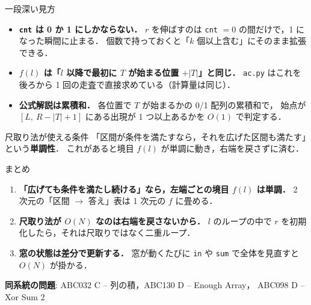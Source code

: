 \documentclass[dvipdfmx,aspectratio=169]{beamer}
\begin{document}
\begin{frame}{一段深い見方}
  \begin{itemize}
    \item \textbf{\texttt{cnt} は 0 か 1 にしかならない．}
      $r$ を伸ばすのは \texttt{cnt} $=0$ の間だけで，1 になった瞬間に止まる．
      個数で持っておくと「$k$ 個以上含む」にそのまま拡張できる．
    \item \textbf{$f(l)$ は「$l$ 以降で最初に $T$ が始まる位置 $+|T|$」と同じ．}
      \texttt{ac.py} はこれを後ろから 1 回の走査で直接求めている（計算量は同じ）．
    \item \textbf{公式解説は累積和．}
      各位置で $T$ が始まるかの 0/1 配列の累積和で，
      始点が $[L,\ R-|T|+1]$ にある出現が 1 つ以上あるかを $O(1)$ で判定する．
  \end{itemize}

  \vspace{0.4em}
  \begin{block}{尺取り法が使える条件}
    「区間が条件を満たすなら，それを広げた区間も満たす」という\textbf{単調性}．
    これがあると境目 $f(l)$ が単調に動き，右端を戻さずに済む．
  \end{block}
\end{frame}

\begin{frame}{まとめ}
  \begin{enumerate}
    \item \textbf{「広げても条件を満たし続ける」なら，左端ごとの境目 $f(l)$ は単調．}
      2 次元の「区間 $\to$ 答え」表は 1 次元の $f$ に畳める．
    \item \textbf{尺取り法が $O(N)$ なのは右端を戻さないから．}
      $l$ のループの中で $r$ を初期化したら，それは尺取りではなく二重ループ．
    \item \textbf{窓の状態は差分で更新する．}
      窓が動くたびに \texttt{in} や \texttt{sum} で全体を見直すと $O(N)$ が掛かる．
  \end{enumerate}

  \vspace{0.6em}
  \textbf{同系統の問題}: ABC032 C -- 列の積，ABC130 D -- Enough Array，
  ABC098 D -- Xor Sum 2
\end{frame}
\end{document}
